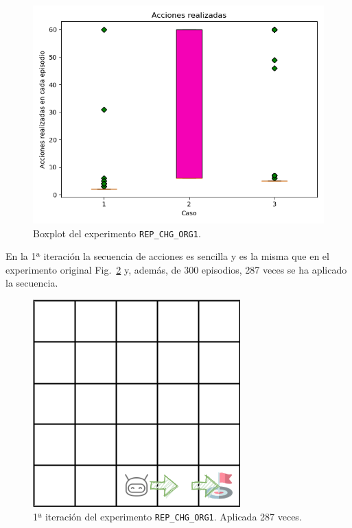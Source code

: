 \begin{figure}
    \centering
    \includegraphics[scale=0.4]{cap5_experimentacion/images/CHANGE_ORIGIN-20_09-00_50-0, 2, 1_boxplot.png}
    \caption{Boxplot del experimento \texttt{REP\_CHG\_ORG1}.}
    \label{fig:CHANGE_ORIGIN-20_09-00_50-0, 2, 1_boxplot}
\end{figure}

En la 1ª iteración la secuencia de acciones es sencilla y es la misma que en el experimento original Fig.~\ref{fig:dim5_CHANGE_ORIGIN-20-09_00-42-50_0, 2, 1_1iter} y, además, de 300 episodios, 287 veces se ha aplicado la secuencia. \\

\begin{figure}
    \centering
    \includegraphics[scale=0.4]{cap5_experimentacion/images/dim5_CHANGE_ORIGIN-20-09_00-42-50.png}
    \caption{1ª iteración del experimento \texttt{REP\_CHG\_ORG1}. Aplicada 287 veces.}
    \label{fig:dim5_CHANGE_ORIGIN-20-09_00-42-50_0, 2, 1_1iter}
\end{figure}

